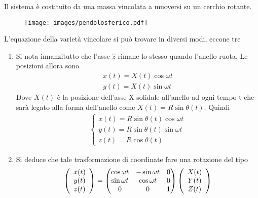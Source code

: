 \documentclass[Main.tex]{subfiles}
\begin{document}
\newpage
\begin{tema}
	Il sistema è costituito da una massa vincolata a muoversi su un cerchio rotante. 
	
	\begin{figure}[H]
    \centering
  \texttt{[image: images/pendolosferico.pdf]}
\end{figure}
	

	
	L'equazione della varietà vincolare si può trovare in diversi modi, eccone tre
	\begin{enumerate}
		\item Si nota innanzitutto che l'asse $\hat z$ rimane lo stesso quando l'anello ruota. Le posizioni allora sono
		\begin{gather}
			x(t) = X(t) \cos \omega t\\
			y(t) = X(t) \sin \omega t
		\end{gather}
		Dove $X(t)$ è la posizione dell'asse X solidale all'anello ad ogni tempo t che sarà legato alla forma dell'anello come $X(t)= R \sin \theta (t)$. Quindi
		\begin{gather}
			\begin{cases}
				x(t) = R \sin \theta(t) \cos \omega t \\
				y(t) = R \sin \theta(t) \sin \omega t \\
				z(t) = R\cos \theta (t)
			\end{cases}
		\end{gather}
		\item Si deduce che tale trasformazione di coordinate fare una rotazione del tipo
		\begin{gather}
			\vec{x(t) \\ y(t) \\ z(t)} = \left( \begin{matrix} 
 	\cos \omega t & - \sin \omega t & 0 \\ \sin \omega t & \cos \omega t & 0 \\ 0 & 0 & 1
 \end{matrix}\right)\vec{X(t) \\ Y(t) \\ Z(t)}
		\end{gather}  
		

\end{enumerate}
\end{tema}
\end{document}
